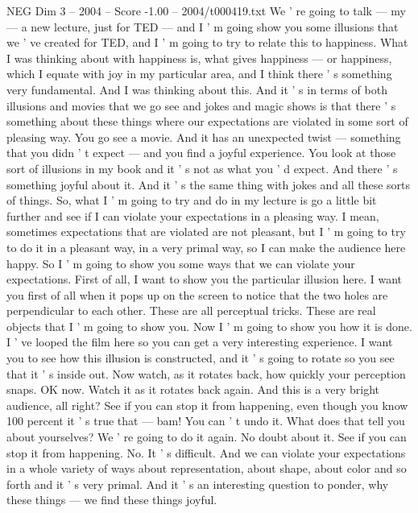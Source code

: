 \begin{textsample}{NEG Dim 3 – 2004 – Score -1.00 – 2004/t000419.txt}  \label{ex:f3_neg_013}
We ' re going to talk — my — a new lecture, just for TED — and I ' m going show you some illusions that we ' ve created for TED, and I ' m going to try to relate this to happiness.
What I was thinking about with happiness is, what gives happiness — or happiness, which I equate with joy in my particular area, and I think there ' s something very fundamental.
And I was thinking about this.
And it ' s in terms of both illusions and movies that we go see and jokes and magic shows is that there ' s something about these things where our expectations are violated in some sort of pleasing way.
You go see a movie.
And it has an unexpected twist — something that you didn ' t expect — and you find a joyful experience.
You look at those sort of illusions in my book and it ' s not as what you ' d expect.
And there ' s something joyful about it.
And it ' s the same thing with jokes and all these sorts of things.
So, what I ' m going to try and do in my lecture is go a little bit further and see if I can violate your expectations in a pleasing way.
I mean, sometimes expectations that are violated are not pleasant, but I ' m going to try to do it in a pleasant way, in a very primal way, so I can make the audience here happy.
So I ' m going to show you some ways that we can violate your expectations.
First of all, I want to show you the particular illusion here.
I want you first of all when it pops up on the screen to notice that the two holes are perpendicular to each other.
These are all perceptual tricks.
These are real objects that I ' m going to show you.
Now I ' m going to show you how it is done.
I ' ve looped the film here so you can get a very interesting experience.
I want you to see how this illusion is constructed, and it ' s going to rotate so you see that it ' s inside out.
Now watch, as it rotates back, how quickly your perception snaps.
OK now.
Watch it as it rotates back again.
And this is a very bright audience, all right?
See if you can stop it from happening, even though you know 100 percent it ' s true that — bam!
You can ' t undo it.
What does that tell you about yourselves?
We ' re going to do it again.
No doubt about it.
See if you can stop it from happening.
No.
It ' s difficult.
And we can violate your expectations in a whole variety of ways about representation, about shape, about color and so forth and it ' s very primal.
And it ' s an interesting question to ponder, why these things — we find these things joyful.

\end{textsample}
